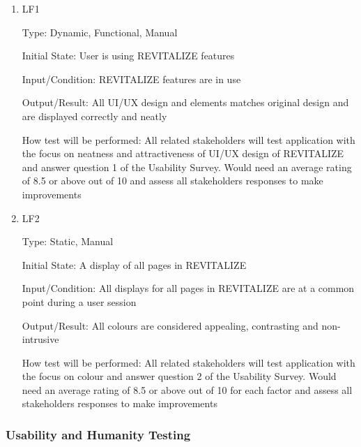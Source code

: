 \documentclass[12pt, titlepage]{article}
\begin{document}
\begin{enumerate}

\item{LF1\\}

Type: Dynamic, Functional, Manual
					
Initial State: User is using REVITALIZE features
					
Input/Condition: REVITALIZE features are in use
					
Output/Result: All UI/UX design and elements matches original design and are displayed correctly and neatly
					
How test will be performed: All related stakeholders will test application with the focus on neatness and attractiveness of UI/UX design of REVITALIZE and answer question 1 of the Usability Survey. Would need an average rating of 8.5 or above out of 10 and assess all stakeholders responses to make improvements
					
\item{LF2\\}

Type: Static, Manual
					
Initial State: A display of all pages in REVITALIZE
					
Input/Condition: All displays for all pages in REVITALIZE are at a common point during a user session
					
Output/Result: All colours are considered appealing, contrasting and non-intrusive
					
How test will be performed: All related stakeholders will test application with the focus on colour and answer question 2 of the Usability Survey. Would need an average rating of 8.5 or above out of 10 for each factor and assess all stakeholders responses to make improvements

\end{enumerate}

\subsubsection{Usability and Humanity Testing}
\end{document}
